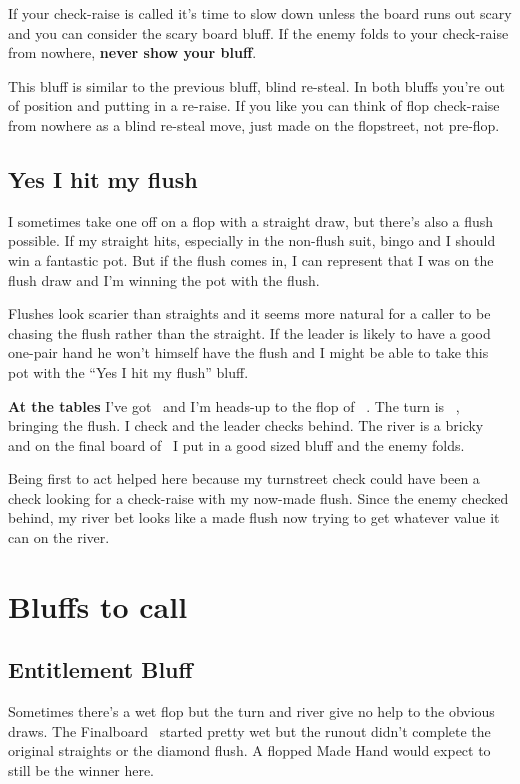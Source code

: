 If your check-raise is called it's time to slow down unless the board
runs out scary and you can consider the scary board bluff. If the
enemy folds to your check-raise from nowhere, \textbf{never show your
bluff}.

This bluff is similar to the previous bluff, blind re-steal. In both
bluffs you're out of position and putting in a re-raise. If you like
you can think of flop check-raise from nowhere as a blind re-steal
move, just made on the flopstreet, not pre-flop.

\subsection{Yes I hit my flush}

I sometimes take one off on a flop with a straight draw, but there's
also a flush possible. If my straight hits, especially in the
non-flush suit, bingo and I should win a fantastic pot. But if the
flush comes in, I can represent that I was on the flush draw and I'm
winning the pot with the flush.

Flushes look scarier than straights and it seems more natural for a
caller to be chasing the flush rather than the straight. If the leader
is likely to have a good one-pair hand he won't himself have the flush
and I might be able to take this pot with the ``Yes I hit my flush''
bluff.

\textbf{At the tables} I've got \nineh\eigc\ and I'm heads-up to the
flop of \Ad\tend\sevc\ . The turn is \tred\ , bringing the flush. I
check and the leader checks behind. The river is a bricky \Qc\, and on
the final board of \Ad\tend\sevc\tred\Qc\ I put in a good sized
bluff and the enemy folds.

Being first to act helped here because my turnstreet check could have
been a check looking for a check-raise with my now-made flush. Since
the enemy checked behind, my river bet looks like a made flush now
trying to get whatever value it can on the river.


\section{Bluffs to call}
\subsection{Entitlement Bluff}

Sometimes there's a wet flop but the turn and river give no help
to the obvious draws. The Finalboard \Jd\tend\fivec\twoh\sixs\ started
pretty wet but the runout didn't complete the original straights or the
diamond flush. A flopped Made Hand would expect to still be the winner
here.

